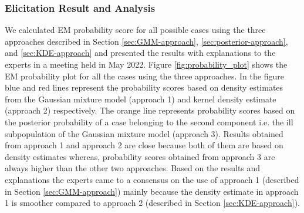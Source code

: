 \subsubsection{Elicitation Result and Analysis}
\label{sec:resanddis}
We calculated EM probability score for all possible cases using the three approaches described in Section \ref{sec:GMM-approach}, \ref{sec:posterior-approach}, and \ref{sec:KDE-approach} and presented the results with explanations to the experts in a meeting held in May 2022. Figure \ref{fig:probability_plot} shows the EM probability plot for all the cases using the three approaches. In the figure blue and red lines represent the probability scores based on density estimates from the Gaussian mixture model (approach 1) and kernel density estimate (approach 2) respectively. The orange line represents probability scores based on the posterior probability of a case belonging to the second component i.e. the ill subpopulation of the Gaussian mixture model (approach 3). Results obtained from approach 1 and approach 2 are close because both of them are based on density estimates whereas, probability scores obtained from approach 3 are always higher than the other two approaches. Based on the results and explanations the experts came to a consensus on the use of approach 1 (described in Section \ref{sec:GMM-approach}) mainly because the density estimate in approach 1 is smoother compared to approach 2 (described in Section \ref{sec:KDE-approach}).

